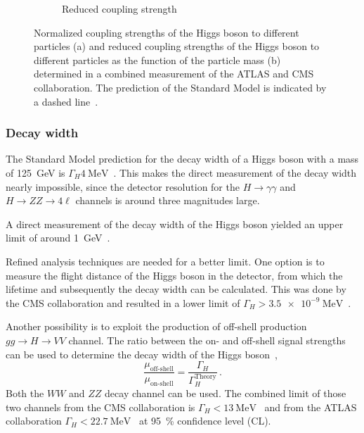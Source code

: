 \begin{figure}[htb]
\begin{subfigure}[c]{0.45\textwidth}
        \caption{Reduced coupling strength}\label{fig:theory:meas:run1:kappareduced}
    \end{subfigure}
    \caption{Normalized coupling strengths of the Higgs boson to different particles (a) and reduced coupling strengths of
             the Higgs boson to different particles as the function of the particle mass (b) determined in a combined measurement
             of the ATLAS and CMS collaboration.
             The prediction of the Standard Model is indicated by a dashed line~\cite{HiggsMuCombined}.}
\end{figure}


\subsubsection{Decay width}\label{subsub:theory:meas:run1:width}

The Standard Model prediction for the decay width of a Higgs boson with a mass of \SI{125}{\GeV} is $\Gamma_H \SI{4}{\MeV}$~\cite{YR1}.
This makes the direct measurement of the decay width nearly impossible, since the detector resolution for the $H\to\gamma\gamma$ and
$H \to ZZ \to 4\ell$ channels is around three magnitudes large.

A direct measurement of the decay width of the Higgs boson yielded an upper limit of around \SI{1}{\GeV}~\cite{HiggsGammaDirectATLAS,HiggsGammaDirectCMS}.

Refined analysis techniques are needed for a better limit.
One option is to measure the flight distance of the Higgs boson in the detector, from which the lifetime and subsequently the decay width can be calculated.
This was done by the CMS collaboration and resulted in a lower limit of $\Gamma_H > \SI{3.5e-9}{\MeV}$~\cite{HiggsGammaLifetimeCMS}.

Another possibility is to exploit the production of off-shell production $gg \to H \to VV$ channel.
The ratio between the on- and off-shell signal strengths can be used to determine the decay width of the Higgs boson~\cite{HiggsGammaOffshellCMSZZ},
\begin{equation}
    \frac{\mu_\text{off-shell}}{\mu_\text{on-shell}} = \frac{\Gamma_H}{\Gamma_H^\text{Theory}} \,.
\end{equation}
Both the $WW$ and $ZZ$ decay channel can be used.
The combined limit of those two channels from the CMS collaboration is $\Gamma_H < \SI{13}{\MeV}$~\cite{HiggsGammaOffshellCMSZZ,HiggsGammaOffshellCMSWW}
and from the ATLAS collaboration $\Gamma_H < \SI{22.7}{\MeV}$~\cite{HiggsGammaOffshellATLAS} at \SI{95}{\percent} confidence level (CL).

